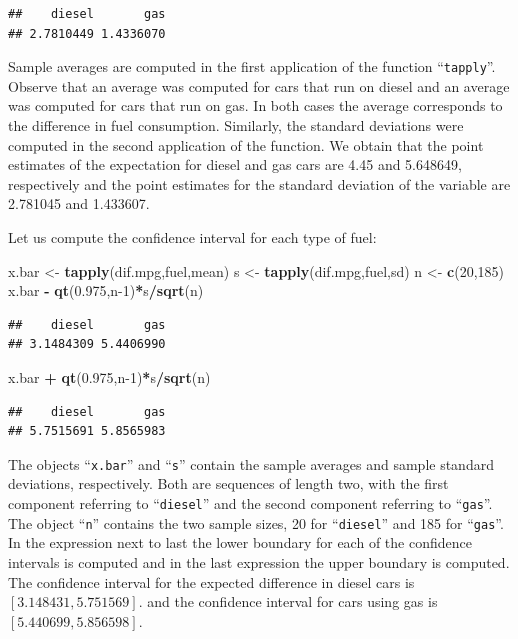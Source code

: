 \documentclass[]{krantz}
\makeatletter
\newenvironment{Shaded}{\begin{snugshade}}{\end{snugshade}}
\newcommand{\DecValTok}[1]{\textcolor[rgb]{0.00,0.00,0.81}{#1}}
\newcommand{\FloatTok}[1]{\textcolor[rgb]{0.00,0.00,0.81}{#1}}
\newcommand{\KeywordTok}[1]{\textcolor[rgb]{0.13,0.29,0.53}{\textbf{#1}}}
\newcommand{\NormalTok}[1]{#1}
\newcommand{\OperatorTok}[1]{\textcolor[rgb]{0.81,0.36,0.00}{\textbf{#1}}}
\newcommand{\StringTok}[1]{\textcolor[rgb]{0.31,0.60,0.02}{#1}}
\newenvironment{kframe}{%
\medskip{}
\setlength{\fboxsep}{.8em}
 \def\at@end@of@kframe{}%
 \ifinner\ifhmode%
  \def\at@end@of@kframe{\end{minipage}}%
  \begin{minipage}{\columnwidth}%
 \fi\fi%
 \def\FrameCommand##1{\hskip\@totalleftmargin \hskip-\fboxsep
 \colorbox{shadecolor}{##1}\hskip-\fboxsep
     \hskip-\linewidth \hskip-\@totalleftmargin \hskip\columnwidth}%
 \MakeFramed {\advance\hsize-\width
   \@totalleftmargin\z@ \linewidth\hsize
   \@setminipage}}%
 {\par\unskip\endMakeFramed%
 \at@end@of@kframe}
\renewenvironment{Shaded}{\begin{kframe}}{\end{kframe}}
\theoremstyle{definition}
\theoremstyle{definition}
\theoremstyle{definition}
\theoremstyle{remark}
\makeatother
\begin{document}
\begin{verbatim}
##    diesel       gas 
## 2.7810449 1.4336070
\end{verbatim}

Sample averages are computed in the first application of the function
``\texttt{tapply}''. Observe that an average was computed for cars that run on
diesel and an average was computed for cars that run on gas. In both
cases the average corresponds to the difference in fuel consumption.
Similarly, the standard deviations were computed in the second
application of the function. We obtain that the point estimates of the
expectation for diesel and gas cars are 4.45 and 5.648649, respectively
and the point estimates for the standard deviation of the variable are
2.781045 and 1.433607.

Let us compute the confidence interval for each type of fuel:

\begin{Shaded}
\begin{Highlighting}[]
\NormalTok{x.bar <-}\StringTok{ }\KeywordTok{tapply}\NormalTok{(dif.mpg,fuel,mean)}
\NormalTok{s <-}\StringTok{ }\KeywordTok{tapply}\NormalTok{(dif.mpg,fuel,sd)}
\NormalTok{n <-}\StringTok{ }\KeywordTok{c}\NormalTok{(}\DecValTok{20}\NormalTok{,}\DecValTok{185}\NormalTok{)}
\NormalTok{x.bar }\OperatorTok{-}\StringTok{ }\KeywordTok{qt}\NormalTok{(}\FloatTok{0.975}\NormalTok{,n}\DecValTok{-1}\NormalTok{)}\OperatorTok{*}\NormalTok{s}\OperatorTok{/}\KeywordTok{sqrt}\NormalTok{(n)}
\end{Highlighting}
\end{Shaded}

\begin{verbatim}
##    diesel       gas 
## 3.1484309 5.4406990
\end{verbatim}

\begin{Shaded}
\begin{Highlighting}[]
\NormalTok{x.bar }\OperatorTok{+}\StringTok{ }\KeywordTok{qt}\NormalTok{(}\FloatTok{0.975}\NormalTok{,n}\DecValTok{-1}\NormalTok{)}\OperatorTok{*}\NormalTok{s}\OperatorTok{/}\KeywordTok{sqrt}\NormalTok{(n)}
\end{Highlighting}
\end{Shaded}

\begin{verbatim}
##    diesel       gas 
## 5.7515691 5.8565983
\end{verbatim}

The objects ``\texttt{x.bar}'' and ``\texttt{s}'' contain the sample averages and sample
standard deviations, respectively. Both are sequences of length two,
with the first component referring to ``\texttt{diesel}'' and the second
component referring to ``\texttt{gas}''. The object ``\texttt{n}'' contains the two sample
sizes, 20 for ``\texttt{diesel}'' and 185 for ``\texttt{gas}''. In the expression next to
last the lower boundary for each of the confidence intervals is computed
and in the last expression the upper boundary is computed. The
confidence interval for the expected difference in diesel cars is
\([3.148431, 5.751569]\). and the confidence interval for cars using gas
is \([5.440699, 5.856598]\).
\end{document}
